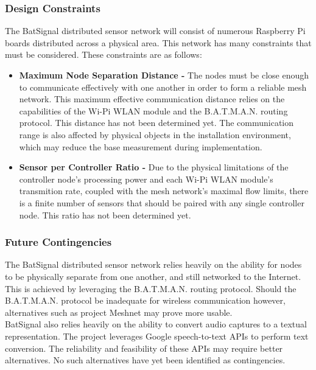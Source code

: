 \documentclass[11pt,a4paper]{article}
\begin{document}
\subsubsection{Design Constraints}
The BatSignal distributed sensor network will consist of numerous Raspberry Pi boards distributed across a physical area. This network has many constraints that must be considered. These constraints are as follows:
\begin{itemize}
	\item{\textbf{Maximum Node Separation Distance -}}
		The nodes must be close enough to communicate effectively with one another in order to form a reliable mesh network. This maximum effective communication distance relies on the capabilities of the Wi-Pi WLAN module and the B.A.T.M.A.N. routing protocol. This distance has not been determined yet.	The communication range is also affected by physical objects in the installation environment, which may reduce the base measurement during implementation.
	\item{\textbf{Sensor per Controller Ratio -}}
		Due to the physical limitations of the controller node's processing power and each Wi-Pi WLAN module's transmition rate, coupled with the mesh network's maximal flow limits, there is a finite number of sensors that should be paired with any single controller node. This ratio has not been determined yet.
\end{itemize}


\subsubsection{Future Contingencies}
The BatSignal distributed sensor network relies heavily on the ability for nodes to be physically separate from one another, and still networked to the Internet. This is achieved by leveraging the B.A.T.M.A.N. routing protocol. Should the B.A.T.M.A.N. protocol be inadequate for wireless communication however, alternatives such as  project Meshnet may prove more usable. \\ 
BatSignal also relies heavily on the ability to convert audio captures to a textual representation. The project leverages Google speech-to-text APIs to perform text conversion. The reliability and feasibility of these APIs may require better alternatives. No such alternatives have yet been identified as contingencies.
\end{document}
